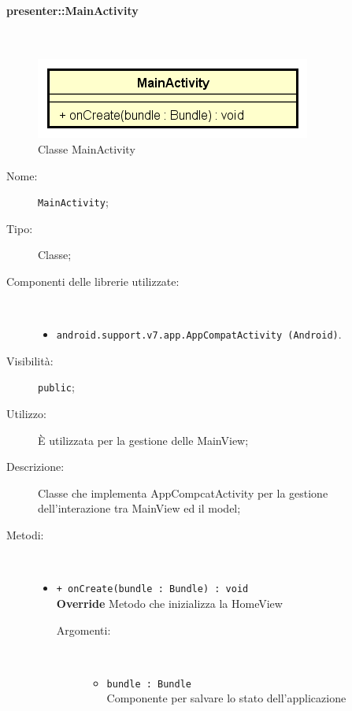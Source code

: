 \documentclass[../DefinizioneDiProdotto.tex]{subfiles}
\begin{document}
\paragraph{presenter::MainActivity}
\
\begin{figure}[H]
	\centering
	\includegraphics[width=\maxwidth]{img/MainActivity.png}
	\caption{Classe MainActivity}\label{fig:presenter::MainActivity} 
\end{figure}
\begin{description}
	\item[Nome:] \texttt{MainActivity};
	\item[Tipo:] Classe;
	\item[Componenti delle librerie utilizzate:] \
	\begin{itemize}
		\item \texttt{android.support.v7.app.AppCompatActivity (Android)}.
		
	\end{itemize}
	\item[Visibilità:] \texttt{public};
	\item[Utilizzo:] È utilizzata per la gestione delle MainView;
	\item[Descrizione:] Classe che implementa AppCompcatActivity per la gestione dell'interazione tra MainView ed il model;
	\item[Metodi:] \
	\begin{itemize}
		\item \texttt{+ onCreate(bundle : Bundle) : void}\\
		\textbf{Override} Metodo che inizializza la HomeView
		\begin{description}
			\item[Argomenti:] \
			\begin{itemize}
				\item \texttt{bundle : Bundle}\\
				Componente per salvare lo stato dell'applicazione\end{itemize}
		\end{description}
	\end{itemize}
\end{description}
\end{document}
